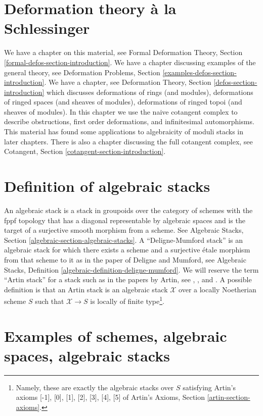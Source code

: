 \section{Deformation theory \`a la Schlessinger}
\label{section-deformation-schlessinger}

\noindent
We have a chapter on this material, see
Formal Deformation Theory, Section \ref{formal-defos-section-introduction}.
We have a chapter discussing examples of the general theory, see
Deformation Problems, Section \ref{examples-defos-section-introduction}.
We have a chapter, see
Deformation Theory, Section \ref{defos-section-introduction}
which discusses deformations of rings (and modules),
deformations of ringed spaces (and sheaves of modules),
deformations of ringed topoi (and sheaves of modules).
In this chapter we use the naive cotangent complex
to describe obstructions, first order deformations, and
infinitesimal automorphisms. This material has found some
applications to algebraicity of moduli stacks in later chapters.
There is also a chapter discussing the full cotangent complex, see
Cotangent, Section \ref{cotangent-section-introduction}.


\section{Definition of algebraic stacks}
\label{section-definition-algebraic-stacks}

\noindent
An algebraic stack is a stack in groupoids over the category of schemes
with the fppf topology that has a diagonal representable by algebraic
spaces and is the target of a surjective smooth morphism from a scheme.
See Algebraic Stacks, Section \ref{algebraic-section-algebraic-stacks}.
A ``Deligne-Mumford stack'' is an algebraic stack for which there exists
a scheme and a surjective \'etale morphism from that scheme to it
as in the paper \cite{DM} of Deligne and Mumford, see
Algebraic Stacks, Definition \ref{algebraic-definition-deligne-mumford}.
We will reserve the term ``Artin stack'' for a stack such as in the papers by
Artin, see \cite{ArtinI}, \cite{ArtinII}, and \cite{ArtinVersal}.
A possible definition is that an Artin stack is an algebraic stack
$\mathcal{X}$ over a locally Noetherian scheme $S$ such that
$\mathcal{X} \to S$ is
locally of finite type\footnote{Namely, these are exactly the algebraic
stacks over $S$ satisfying Artin's axioms [-1], [0], [1], [2], [3], [4], [5]
of Artin's Axioms, Section \ref{artin-section-axioms}.}.


\section{Examples of schemes, algebraic spaces, algebraic stacks}
\label{section-examples-stacks}

